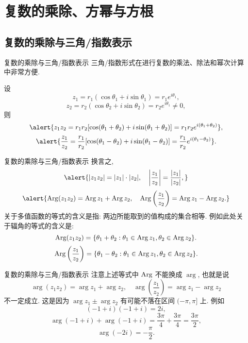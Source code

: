 \section{复数的乘除、方幂与方根}

\subsection{复数的乘除与三角/指数表示}
\begin{frame}{复数的乘除与三角/指数表示}
\onslide<+->
三角/指数形式在进行复数的乘法、除法和幂次计算中非常方便.
\onslide<+->
\begin{theorem}
设
\[z_1=r_1(\cos\theta_1+i\sin\theta_1)=r_1e^{i\theta_1},\]
\[z_2=r_2(\cos\theta_2+i\sin\theta_2)=r_2e^{i\theta_1}\neq 0,\]
则
\[\alert{z_1z_2=r_1r_2[\cos(\theta_1+\theta_2)+i\sin(\theta_1+\theta_2)]=r_1r_2e^{i(\theta_1+\theta_2)}},\]
\[\alert{\frac{z_1}{z_2}=\frac{r_1}{r_2}[\cos(\theta_1-\theta_2)+i\sin(\theta_1-\theta_2)]=\frac{r_1}{r_2}e^{i(\theta_1-\theta_2)}}.\]
\end{theorem}
\end{frame}


\begin{frame}{复数的乘除与三角/指数表示}
\onslide<+->
换言之,
\[\alert{|z_1z_2|=|z_1|\cdot|z_2|,\quad\abs{\frac{z_1}{z_2}}=\frac{|z_1|}{|z_2|},}\]
\onslide<+->
\[\alert{\Arg(z_1z_2)=\Arg z_1+\Arg z_2,\quad
\Arg\left(\frac{z_1}{z_2}\right)=\Arg z_1-\Arg z_2.}\]
\onslide<+->
关于多值函数的等式的含义是指: 两边所能取到的值构成的集合相等.
\onslide<+->
例如此处关于辐角的等式的含义是:
\[\operatorname{Arg}(z_1z_2)={\left\{\theta_1+\theta_2:\theta_1\in\operatorname{Arg} z_1,\theta_2\in\operatorname{Arg} z_2\right\}}.\]
\[\operatorname{Arg}\left(\frac{z_1}{z_2}\right)={\left\{\theta_1-\theta_2:\theta_1\in\operatorname{Arg} z_1,\theta_2\in\operatorname{Arg} z_2\right\}}.\]
\end{frame}


\begin{frame}{复数的乘除与三角/指数表示}
\onslide<+->
注意上述等式中 $\operatorname{Arg}$ 不能换成 $\arg$, 也就是说
\[\arg(z_1z_2)=\arg z_1+\arg z_2,\quad
\arg\left(\frac{z_1}{z_2}\right)=\arg z_1-\arg z_2\]
\alert{不一定成立}.
\onslide<+->
这是因为 $\arg z_1\pm\arg z_2$ 有可能不落在区间 $(-\pi,\pi]$ 上.
\onslide<+->
例如
\[(-1+i)(-1+i)=2i,\]
\vspace{-0.5\baselineskip}
\onslide<+->
\[\arg(-1+i)+\arg(-1+i)=\frac{3\pi}4+\frac{3\pi}4=\frac{3\pi}2,\]
\vspace{-0.5\baselineskip}
\onslide<+->
\[\arg(-2i)=-\frac\pi2.\]
\end{frame}


